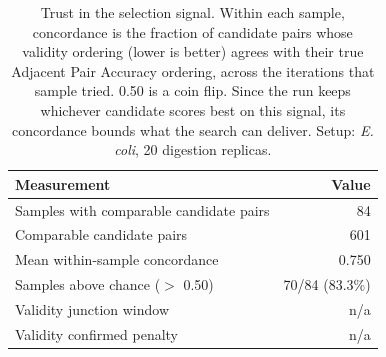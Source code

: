 \begin{table}[!tb]
  \centering
  \caption{Trust in the selection signal. Within each sample, concordance is the fraction of candidate pairs whose validity ordering (lower is better) agrees with their true Adjacent Pair Accuracy ordering, across the iterations that sample tried. 0.50 is a coin flip. Since the run keeps whichever candidate scores best on this signal, its concordance bounds what the search can deliver. Setup: \textnormal{\textnormal{\textit{E. coli}}}, 20 digestion replicas.}
  \label{tab:validity_concordance_ecoli_r20}
  \begin{tabular}{lr}
    \toprule
    Measurement & Value \\
    \midrule
    Samples with comparable candidate pairs & 84 \\
    Comparable candidate pairs & 601 \\
    Mean within-sample concordance & 0.750 \\
    Samples above chance ($>$ 0.50) & 70/84 (83.3\%) \\
    Validity junction window & n/a \\
    Validity confirmed penalty & n/a \\
    \bottomrule
  \end{tabular}
\end{table}
